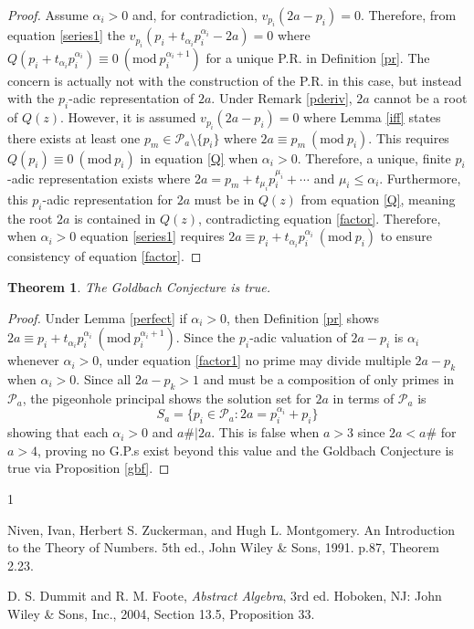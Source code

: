 \documentclass[12pt,a4paper]{amsart}
\numberwithin{equation}{section}
\theoremstyle{theorem}
\theoremstyle{definition}
\newtheorem{theorem}{Theorem}
\theoremstyle{remark}
\theoremstyle{con}
\newcommand{\Mod}[1]{\ (\mathrm{mod}\ #1)}
\begin{document}
\begin{proof}
Assume $\alpha_i > 0$ and, for contradiction, $v_{p_i}(2a - p_i) = 0$. Therefore, from equation \ref{series1} the  $v_{p_i}(p_i + t_{\alpha_i}p_i^{\alpha_i}-2a) = 0$ where $Q(p_i + t_{\alpha_i}p_i^{\alpha_i}) \equiv 0 \Mod{p_i^{\alpha_i +1}}$ for a unique P.R. in Definition \ref{pr}. The concern is actually not with the construction of the P.R. in this case, but instead with the $p_i$-adic representation of $2a$. Under Remark \ref{pderiv}, $2a$ cannot be a root of $Q(z)$.  However, it is assumed $v_{p_i}(2a - p_i) = 0$ where Lemma \ref{iff} states there exists at least one $p_m \in \mathcal{P}_a \setminus \{p_i\}$ where $2a \equiv p_m \Mod{p_i}$. This requires $Q(p_i) \equiv 0 \Mod{p_i}$ in equation \ref{Q} when $\alpha_i > 0$. Therefore, a unique, finite $p_i$-adic representation exists where $2a = p_m + t_{\mu_i} p_i^{\mu_i} + \cdots$ and $\mu_i \leq \alpha_i$. Furthermore, this $p_i$-adic representation for $2a$ must be in $Q(z)$ from equation \ref{Q}, meaning the root $2a$ is contained in $Q(z)$, contradicting equation \ref{factor}. Therefore, when $\alpha_i > 0$ equation \ref{series1} requires $2a \equiv p_i + t_{\alpha_i}p_i^{\alpha_i} \Mod{p_i}$ to ensure consistency of equation \ref{factor}.
\end{proof}



\begin{theorem}\label{gbt}
\textit{The Goldbach Conjecture is true.}
\end{theorem}

\begin{proof}
Under Lemma \ref{perfect} if $\alpha_i > 0$, then Definition \ref{pr} shows $2a \equiv p_i + t_{\alpha_i}p_i^{\alpha_i} \Mod{p_i^{\alpha_i + 1}}$. Since the $p_i$-adic valuation of $2a - p_i$ is $\alpha_i$ whenever $\alpha_i > 0$, under equation \ref{factor1} no prime may divide multiple $2a - p_k$ when $\alpha_i > 0$. Since all $2a - p_k > 1$ and must be a composition of only primes in $\mathcal{P}_a$, the pigeonhole principal shows the solution set for $2a$ in terms of $\mathcal{P}_a$ is
\[
S_a = \{p_i \in \mathcal{P}_a : 2a = p_i^{\alpha_i} + p_i \}
\]
showing that each $\alpha_i > 0$ and $a\# | 2a$. This is false when $a > 3$ since $2a < a\#$ for $a > 4$, proving no G.P.s exist beyond this value and the Goldbach Conjecture is true via Proposition \ref{gbf}.
\end{proof}



\thispagestyle{plain}


\begin{thebibliography}{1}


 Niven, Ivan, Herbert S. Zuckerman, and Hugh L. Montgomery. An Introduction to the Theory of Numbers. 5th ed., John Wiley \& Sons, 1991. p.87,  Theorem 2.23.

D. S. Dummit and R. M. Foote, \textit{Abstract Algebra}, 3rd ed. Hoboken, NJ: John Wiley \& Sons, Inc., 2004, Section 13.5, Proposition 33.

\end{thebibliography}
\end{document}
